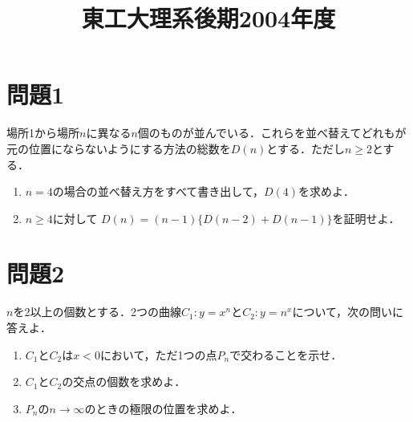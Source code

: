 \documentclass[unicode,12pt, a4paper]{ltjsarticle}%
\title{東工大理系後期2004年度}
\begin{document}
\maketitle
\section{問題1}
場所1から場所$n$に異なる$n$個のものが並んでいる．これらを並べ替えてどれもが元の位置にならないようにする方法の総数を$D(n)$とする．ただし$n \ge 2$とする．

\begin{enumerate}
    \item $n=4$の場合の並べ替え方をすべて書き出して，$D(4)$を求めよ．
    \item $n \ge 4$に対して $D(n)=(n-1)\{D(n-2)+D(n-1)\}$を証明せよ．
\end{enumerate}


\section{問題2}
$n$を2以上の個数とする．2つの曲線$C_1: y=x^n$と$C_2: y=n^x$について，次の問いに答えよ．

\begin{enumerate}
    \item $C_1$と$C_2$は$x<0$において，ただ1つの点$P_n$で交わることを示せ．
    \item $C_1$と$C_2$の交点の個数を求めよ．
    \item $P_n$の$n \to \infty$のときの極限の位置を求めよ．
\end{enumerate}
\end{document}
